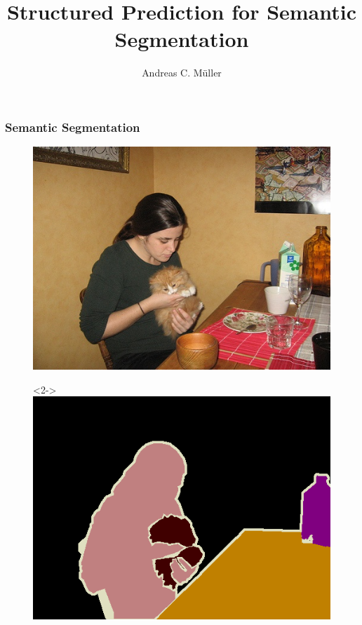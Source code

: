 \documentclass[final,ignorenonframetext,compress]{beamer}
\title[Stuctured Prediction for Semantic Segmentation] %
{Structured Prediction for Semantic Segmentation}
\author%
{Andreas C. M\"uller}
\institute[] %
{%
    Columbia University
}
\begin{document}
\begin{frame}
    \titlepage
\end{frame}

\begin{frame}
    \tableofcontents
\end{frame}

\begin{frame}
    \frametitle{Semantic Segmentation}
        \begin{figure}
            \includegraphics[width=.4 \textwidth]{images/pascal}
            \begin{visibleenv}<2->
                \includegraphics[width=.4 \textwidth]{images/pascal_gt}
            \end{visibleenv}
        \end{figure}
\end{frame}
\end{document}
